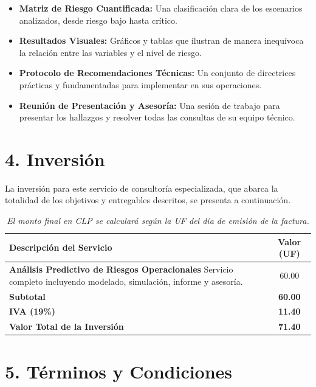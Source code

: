\documentclass[a4paper,12pt]{article}
\begin{document}
\begin{itemize}[leftmargin=*, label=\textbullet]
    \item \textbf{Matriz de Riesgo Cuantificada:} Una clasificación clara de los escenarios analizados, desde riesgo bajo hasta crítico.
    \item \textbf{Resultados Visuales:} Gráficos y tablas que ilustran de manera inequívoca la relación entre las variables y el nivel de riesgo.
    \item \textbf{Protocolo de Recomendaciones Técnicas:} Un conjunto de directrices prácticas y fundamentadas para implementar en sus operaciones.
    \item \textbf{Reunión de Presentación y Asesoría:} Una sesión de trabajo para presentar los hallazgos y resolver todas las consultas de su equipo técnico.
\end{itemize}

\section*{4. Inversión}
La inversión para este servicio de consultoría especializada, que abarca la totalidad de los objetivos y entregables descritos, se presenta a continuación.

\begin{table}[h!]
    \centering
    \renewcommand{\arraystretch}{1.5}
    \begin{tabular}{|p{10cm}|c|}
        \hline
        \rowcolor{dark_gray!80}
        \textbf{\color{white}Descripción del Servicio} & \textbf{\color{white}Valor (UF)} \\
        \hline
        \rowcolor{light_gray}
        \textbf{Análisis Predictivo de Riesgos Operacionales} \newline \small{Servicio completo incluyendo modelado, simulación, informe y asesoría.} & 60.00 \\
        \hline
        \textbf{Subtotal} & \textbf{60.00} \\
        \hline
        \textbf{IVA (19\%)} & \textbf{11.40} \\
        \hline
        \rowcolor{light_gray}
        \textbf{Valor Total de la Inversión} & \textbf{71.40} \\
        \hline
    \end{tabular}
    \caption*{\small{\textit{El monto final en CLP se calculará según la UF del día de emisión de la factura.}}}
\end{table}

\section*{5. Términos y Condiciones}
\end{document}
